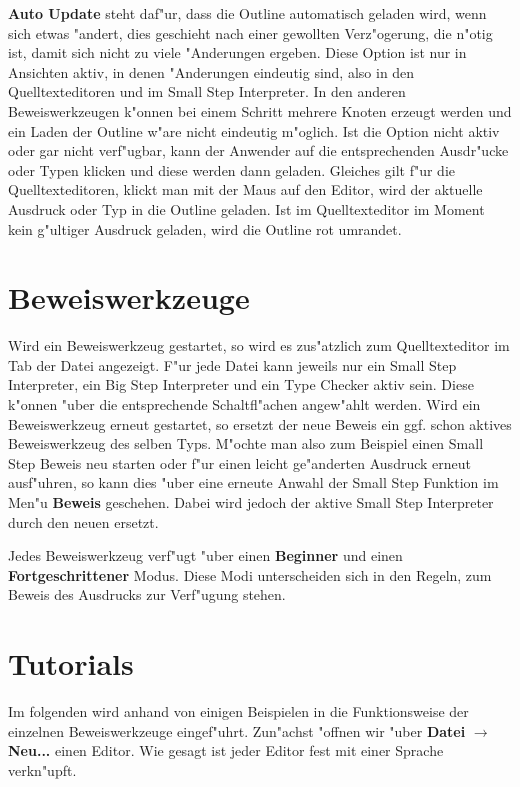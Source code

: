 {\bf Auto Update} steht daf"ur, dass die Outline automatisch geladen wird,
wenn sich etwas "andert, dies geschieht nach einer gewollten Verz"ogerung,
die n"otig ist, damit sich nicht zu viele "Anderungen ergeben. Diese Option
ist nur in Ansichten aktiv, in denen "Anderungen eindeutig sind, also in den
Quelltexteditoren und im Small Step Interpreter. In den anderen
Beweiswerkzeugen k"onnen bei einem Schritt mehrere Knoten erzeugt werden
und ein Laden der Outline w"are nicht eindeutig m"oglich.
Ist die Option nicht aktiv oder gar nicht verf"ugbar, kann der Anwender auf 
die entsprechenden Ausdr"ucke oder Typen klicken und diese werden dann geladen.
Gleiches gilt f"ur die Quelltexteditoren, klickt man mit der Maus auf den
Editor, wird der aktuelle Ausdruck oder Typ in die Outline geladen. Ist im
Quelltexteditor im Moment kein g"ultiger Ausdruck geladen, wird die Outline
rot umrandet.


\section {Beweiswerkzeuge}
\label{Beweiswerkzeuge} Wird ein Beweiswerkzeug gestartet, so wird
es zus"atzlich zum Quelltexteditor im Tab der Datei angezeigt. F"ur
jede Datei kann jeweils nur ein Small Step Interpreter, ein Big Step
Interpreter und ein Type Checker aktiv sein. Diese k"onnen "uber die
entsprechende Schaltfl"achen angew"ahlt werden. Wird ein
Beweiswerkzeug erneut gestartet, so ersetzt der neue Beweis ein ggf.
schon aktives Beweiswerkzeug des selben Typs. M"ochte man also zum
Beispiel einen Small Step Beweis neu starten oder f"ur einen leicht
ge"anderten Ausdruck erneut ausf"uhren, so kann dies "uber eine
erneute Anwahl der Small Step Funktion im Men"u {\bf Beweis}
geschehen. Dabei wird jedoch der aktive Small Step Interpreter durch
den neuen ersetzt.

Jedes Beweiswerkzeug verf"ugt "uber einen {\bf Beginner} und einen
{\bf Fortgeschrittener} Modus. Diese Modi unterscheiden sich in den
Regeln, zum Beweis des Ausdrucks zur Verf"ugung stehen.

\section {Tutorials}
Im folgenden wird anhand von einigen Beispielen in die
Funktionsweise der einzelnen Beweiswerkzeuge eingef"uhrt. Zun"achst
"offnen wir "uber {\bf Datei} $\rightarrow$ {\bf Neu...} einen
Editor. Wie gesagt ist jeder Editor fest mit einer Sprache
verkn"upft.

